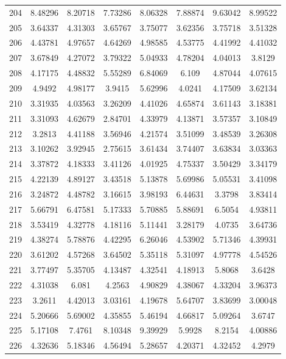 \begin{figure}
\begin{tabular}{cccccccc}
204 & 8.48296 & 8.20718 & 7.73286 & 8.06328 & 7.88874 & 9.63042 & 8.99522\\
205 & 3.64337 & 4.31303 & 3.65767 & 3.75077 & 3.62356 & 3.75718 & 3.51328\\
206 & 4.43781 & 4.97657 & 4.64269 & 4.98585 & 4.53775 & 4.41992 & 4.41032\\
207 & 3.67849 & 4.27072 & 3.79322 & 5.04933 & 4.78204 & 4.04013 & 3.8129\\
208 & 4.17175 & 4.48832 & 5.55289 & 6.84069 & 6.109 & 4.87044 & 4.07615\\
209 & 4.9492 & 4.98177 & 3.9415 & 5.62996 & 4.0241 & 4.17509 & 3.62134\\
210 & 3.31935 & 4.03563 & 3.26209 & 4.41026 & 4.65874 & 3.61143 & 3.18381\\
211 & 3.31093 & 4.62679 & 2.84701 & 4.33979 & 4.13871 & 3.57357 & 3.10849\\
212 & 3.2813 & 4.41188 & 3.56946 & 4.21574 & 3.51099 & 3.48539 & 3.26308\\
213 & 3.10262 & 3.92945 & 2.75615 & 3.61434 & 3.74407 & 3.63834 & 3.03363\\
214 & 3.37872 & 4.18333 & 3.41126 & 4.01925 & 4.75337 & 3.50429 & 3.34179\\
215 & 4.22139 & 4.89127 & 3.43518 & 5.13878 & 5.69986 & 5.05531 & 3.41098\\
216 & 3.24872 & 4.48782 & 3.16615 & 3.98193 & 6.44631 & 3.3798 & 3.83414\\
217 & 5.66791 & 6.47581 & 5.17333 & 5.70885 & 5.88691 & 6.5054 & 4.93811\\
218 & 3.53419 & 4.32778 & 4.18116 & 5.11441 & 3.28179 & 4.0735 & 3.64736\\
219 & 4.38274 & 5.78876 & 4.42295 & 6.26046 & 4.53902 & 5.71346 & 4.39931\\
220 & 3.61202 & 4.57268 & 3.64502 & 5.35118 & 5.31097 & 4.97778 & 4.54526\\
221 & 3.77497 & 5.35705 & 4.13487 & 4.32541 & 4.18913 & 5.8068 & 3.6428\\
222 & 4.31038 & 6.081 & 4.2563 & 4.90829 & 4.38067 & 4.33204 & 3.96373\\
223 & 3.2611 & 4.42013 & 3.03161 & 4.19678 & 5.64707 & 3.83699 & 3.00048\\
224 & 5.20666 & 5.69002 & 4.35855 & 5.46194 & 4.66817 & 5.09264 & 3.6747\\
225 & 5.17108 & 7.4761 & 8.10348 & 9.39929 & 5.9928 & 8.2154 & 4.00886\\
226 & 4.32636 & 5.18346 & 4.56494 & 5.28657 & 4.20371 & 4.32452 & 4.2979\\

\end{tabular}
\end{figure}
